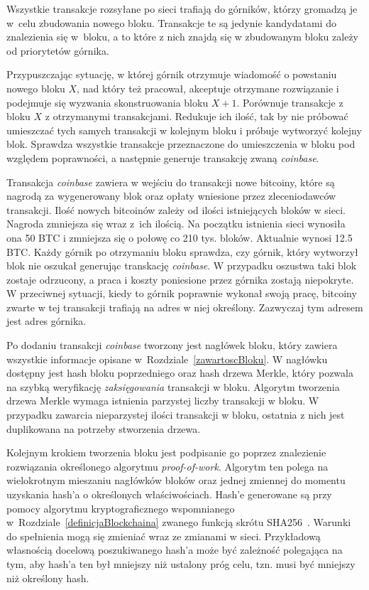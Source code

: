 \documentclass[12pt, oneside, final, openany]{mgr}
\begin{document}
\indent Wszystkie transakcje rozsyłane po sieci trafiają do górników, którzy gromadzą je w~celu zbudowania nowego bloku. Transakcje te są jedynie kandydatami do znalezienia się w~bloku, a to które z nich znajdą się w zbudowanym bloku zależy od priorytetów górnika. 

\indent Przypuszczając sytuację, w której górnik otrzymuje wiadomość o powstaniu nowego bloku $X$, nad który też pracował, akceptuje otrzymane rozwiązanie i podejmuje się wyzwania skonstruowania bloku $X+1$. Porównuje transakcje z bloku $X$ z otrzymanymi transakcjami. Redukuje ich ilość, tak by nie próbować umieszczać tych samych transakcji w kolejnym bloku i próbuje wytworzyć kolejny blok. Sprawdza wszystkie transakcje przeznaczone do umieszczenia w bloku pod względem poprawności, a następnie generuje transakcję zwaną \textit{coinbase}. 

\indent Transakcja \textit{coinbase} zawiera w wejściu do transakcji nowe bitcoiny, które są nagrodą za wygenerowany blok oraz opłaty wniesione przez zleceniodawców transakcji. Ilość nowych bitcoinów zależy od ilości istniejących bloków w sieci. Nagroda zmniejsza się wraz z~ich ilością. Na początku istnienia sieci wynosiła ona 50 BTC i zmniejsza się o połowę co 210 tys. bloków. Aktualnie wynosi 12.5 BTC. Każdy górnik po otrzymaniu bloku sprawdza, czy górnik, który wytworzył blok nie oszukał generując transkację \textit{coinbase}. W przypadku oszustwa taki blok zostaje odrzucony, a praca i koszty poniesione przez górnika zostają niepokryte. W przeciwnej sytuacji, kiedy to górnik poprawnie wykonał swoją pracę, bitcoiny zwarte w tej transakcji trafiają na adres w niej określony. Zazwyczaj tym adresem jest adres górnika.

\indent Po dodaniu transakcji \textit{coinbase} tworzony jest nagłówek bloku, który zawiera wszystkie informacje opisane w~Rozdziale~\ref{zawartoscBloku}. W nagłówku dostępny jest hash bloku poprzedniego oraz hash drzewa Merkle, który pozwala na szybką weryfikację \textit{zaksięgowania} transakcji w bloku. Algorytm tworzenia drzewa Merkle wymaga istnienia parzystej liczby transakcji w bloku. W przypadku zawarcia nieparzystej ilości transakcji w bloku, ostatnia z nich jest duplikowana na potrzeby stworzenia drzewa.

\indent Kolejnym krokiem tworzenia bloku jest podpisanie go poprzez znalezienie rozwiązania określonego algorytmu \textit{proof-of-work}. Algorytm ten polega na wielokrotnym mieszaniu nagłówków bloków oraz jednej zmiennej do momentu uzyskania hash'a o określonych właściwościach. Hash'e generowane są przy pomocy algorytmu kryptograficznego wspomnianego w~Rozdziale~\ref{definicjaBlockchaina} zwanego funkcją skrótu SHA256~\cite{podstawyKryptografii}. Warunki do spełnienia mogą się zmieniać wraz ze zmianami w sieci. Przykładową własnością docelową poszukiwanego hash'a może być zależność polegająca na tym, aby hash'a ten był mniejszy niż ustalony próg celu, tzn. musi być mniejszy niż określony hash.
\end{document}
